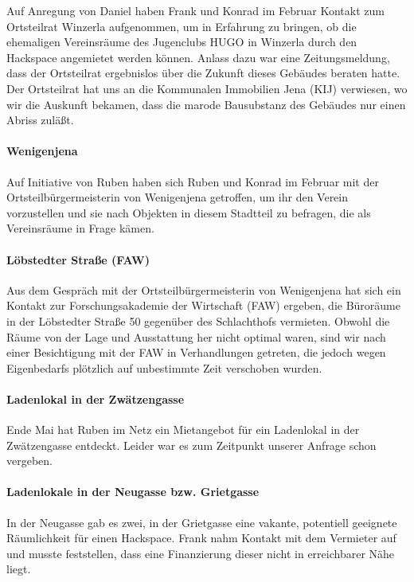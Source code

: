 \documentclass[10pt,DIV16]{scrartcl}
\begin{document}
Auf Anregung von Daniel haben Frank und Konrad im Februar Kontakt zum
Ortsteilrat Winzerla aufgenommen, um in Erfahrung zu bringen, ob die
ehemaligen Vereinsräume des Jugenclubs HUGO in Winzerla durch den Hackspace
angemietet werden können.  Anlass dazu war eine Zeitungsmeldung, dass der
Ortsteilrat ergebnislos über die Zukunft dieses Gebäudes beraten hatte.  Der
Ortsteilrat hat uns an die Kommunalen Immobilien Jena (KIJ) verwiesen, wo wir
die Auskunft bekamen, dass die marode Bausubstanz des Gebäudes nur einen
Abriss zuläßt.

\paragraph{Wenigenjena}

Auf Initiative von Ruben haben sich Ruben und Konrad im Februar mit der
Orts\-teil\-bür\-ger\-meis\-te\-rin von Wenigenjena getroffen, um ihr den
Verein vorzustellen und sie nach Objekten in diesem Stadtteil zu befragen, die
als Vereinsräume in Frage kämen.

\paragraph{Löbstedter Straße (FAW)}

Aus dem Gespräch mit der Ortsteilbürgermeisterin von Wenigenjena hat sich ein
Kontakt zur Forschungsakademie der Wirtschaft (FAW) ergeben, die Büroräume in
der Löbstedter Straße 50 gegenüber des Schlachthofs vermieten.  Obwohl die
Räume von der Lage und Ausstattung her nicht optimal waren, sind wir nach
einer Besichtigung mit der FAW in Verhandlungen getreten, die jedoch wegen
Eigenbedarfs plötzlich auf unbestimmte Zeit verschoben wurden.

\paragraph{Ladenlokal in der Zwätzengasse}

Ende Mai hat Ruben im Netz ein Mietangebot für ein Ladenlokal in der
Zwätzengasse entdeckt.  Leider war es zum Zeitpunkt unserer Anfrage schon
vergeben.

\paragraph{Ladenlokale in der Neugasse bzw. Grietgasse}

In der Neugasse gab es zwei, in der Grietgasse eine vakante, 
potentiell geeignete Räumlichkeit für einen Hackspace. Frank nahm 
Kontakt mit dem Vermieter auf und musste feststellen, dass eine 
Finanzierung dieser nicht in erreichbarer Nähe liegt.
\end{document}
